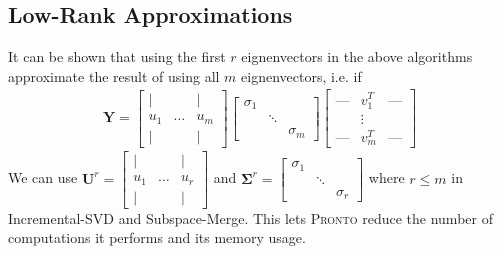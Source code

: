 \subsection{Low-Rank Approximations}
It can be shown that using the first $r$ eignenvectors in the above algorithms
approximate the result of using all $m$ eignenvectors, i.e. if
\begin{align}
\mathbf{Y} = \begin{bmatrix} \mid & & \mid \\ u_1 & \ldots & u_m
    \\ \mid & & \mid  \end{bmatrix} \begin{bmatrix} \sigma_1 &
        & \\ & \ddots & \\ & & \sigma_m \end{bmatrix} \begin{bmatrix} \text{---}
& v_1^T & \text{---} \\ & \vdots & \\ \text{---} & v_m^T & \text{---}
\end{bmatrix}
\end{align}
We can use $\mathbf{U}^r = \begin{bmatrix} \mid & & \mid \\ u_1 & \ldots & u_r
    \\ \mid & & \mid  \end{bmatrix}$ and $\mathbf{\Sigma}^r = \begin{bmatrix}
\sigma_1 & & \\ & \ddots & \\ & & \sigma_r \end{bmatrix}$ where $r \leq m$ in
Incremental-SVD and Subspace-Merge. This lets \textsc{Pronto} reduce the number of
computations it performs and its memory usage.

